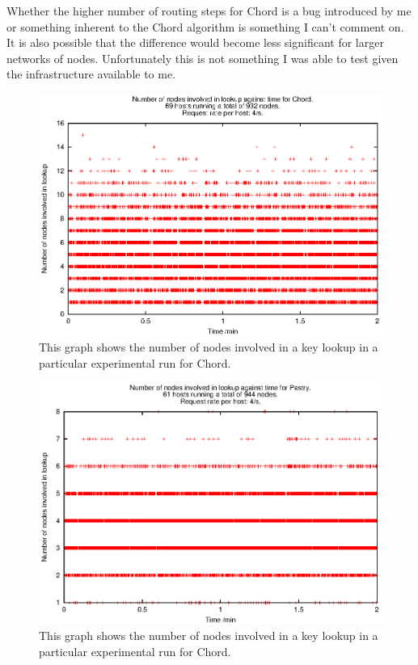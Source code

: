 Whether the higher number of routing steps for Chord is a bug introduced by me or something inherent to the Chord algorithm is something I can't comment on. It is also possible that the difference would become less significant for larger networks of nodes. Unfortunately this is not something I was able to test given the infrastructure available to me.

\begin{figure}[!htb]
  \begin{center}
    \includegraphics[width=0.9\linewidth]{illustrations/nodes_against_time_chord.eps}
    \caption{This graph shows the number of nodes involved in a key lookup in a particular experimental run for Chord.}
    \label{figChordNumNodes}
  \end{center}
\end{figure}

\begin{figure}[!htb]
  \begin{center}
    \includegraphics[width=0.9\linewidth]{illustrations/nodes_against_time_pastry.eps}
    \caption{This graph shows the number of nodes involved in a key lookup in a particular experimental run for Chord.}
    \label{figPastryNumNodes}
  \end{center}
\end{figure}

